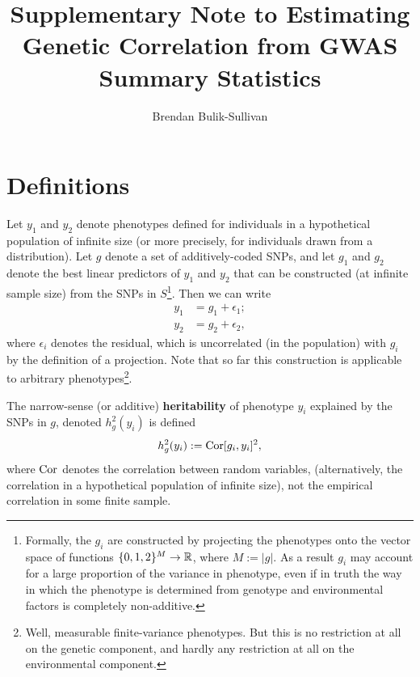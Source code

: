 \documentclass[11pt]{article}
\title{Supplementary Note to Estimating Genetic Correlation from GWAS Summary Statistics}
\author{Brendan Bulik-Sullivan}
\numberwithin{equation}{section}
\numberwithin{definition}{section}
\numberwithin{thm}{section}
\numberwithin{lemma}{section}
\numberwithin{prop}{section}
\numberwithin{cor}{section}
\numberwithin{hyp}{section}
\begin{document}
\maketitle
\tableofcontents
\newpage

\section{Definitions}\label{Definitions}

Let $y_1$ and $y_2$ denote phenotypes defined for individuals in a hypothetical population of infinite size 
(or more precisely, for individuals drawn from a distribution). 
Let $g$ denote a set of additively-coded SNPs, 
and let $g_1$ and $g_2$ denote the best linear predictors of $y_1$ and $y_2$ that can be constructed (at infinite sample size) from the SNPs in $S$\footnote
{Formally, the $g_i$ are constructed by projecting the phenotypes onto the vector space of functions $\{0,1,2\}^M\to\mathbb{R}$, where $M:=|g|.$
As a result $g_i$ may account for a large proportion of the variance in phenotype, 
even if in truth the way in which the phenotype is determined from genotype and environmental factors is completely non-additive.}.
Then we can write
\begin{align*}
	y_1 &= g_1 + \epsilon_1;\\
	y_2 &= g_2 + \epsilon_2,
\end{align*}
where $\epsilon_i$ denotes the residual, which is uncorrelated (in the population) with $g_i$ by the definition of a projection.
Note that so far this construction is applicable to arbitrary phenotypes\footnote{
Well, measurable finite-variance phenotypes. 
But this is no restriction at all on the genetic component, and hardly any restriction at all on the environmental component.}.

\begin{definition}\label{h2}
The narrow-sense (or additive) \textbf{heritability} of phenotype $y_i$ explained by the SNPs in $g$, 
denoted $h^2_g(y_i)$ is defined
\begin{equation}
h^2_g(y_i) := \mathrm{Cor}[g_i,y_i]^2,
\end{equation}
\noindent
where $\mathrm{Cor}$ denotes the correlation between random variables,
(alternatively, the correlation in a hypothetical population of infinite size),
not the empirical correlation in some finite sample.
\end{definition}
\end{document}
